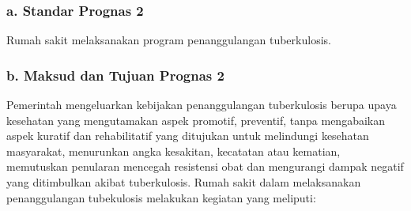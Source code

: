 \documentclass[
]{book}
\begin{document}
\hypertarget{a.-standar-prognas-2}{%
\subsubsection*{a. Standar Prognas 2}\label{a.-standar-prognas-2}}

Rumah sakit melaksanakan program penanggulangan tuberkulosis.

\hypertarget{b.-maksud-dan-tujuan-prognas-2}{%
\subsubsection*{b. Maksud dan Tujuan Prognas 2}\label{b.-maksud-dan-tujuan-prognas-2}}

Pemerintah mengeluarkan kebijakan penanggulangan tuberkulosis berupa upaya kesehatan yang mengutamakan aspek promotif, preventif, tanpa mengabaikan aspek kuratif dan rehabilitatif yang ditujukan untuk melindungi kesehatan masyarakat, menurunkan angka kesakitan, kecatatan atau kematian, memutuskan penularan mencegah resistensi obat dan mengurangi dampak negatif yang ditimbulkan akibat tuberkulosis.
Rumah sakit dalam melaksanakan penanggulangan tubekulosis melakukan kegiatan yang meliputi:
\end{document}
